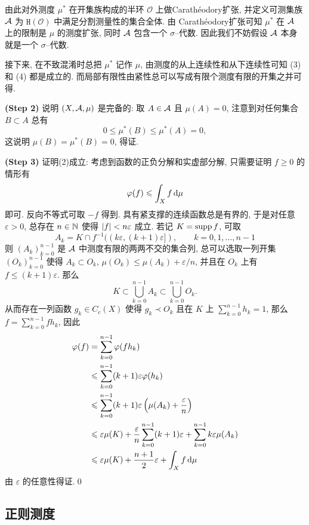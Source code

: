 \begin{Proof}
		由此对外测度 $ \mu^* $ 在开集族构成的半环 $ \mathcal{O} $ 上做Carath\'eodory扩张, 并定义可测集族 $ \mathcal{A} $ 为 $ \mathtt{H}(\mathcal{O}) $ 中满足分割测量性的集合全体. 由 Carath\'eodory扩张可知 $ \mu^* $ 在 $ \mathcal{A} $ 上的限制是 $ \mu $ 的测度扩张, 同时 $ \mathcal{A} $ 包含一个 $ \sigma $--代数. 因此我们不妨假设 $ \mathcal{A} $ 本身就是一个 $ \sigma $--代数.

		接下来, 在不致混淆时总把 $ \mu^* $ 记作 $ \mu $, 由测度的从上连续性和从下连续性可知 (3) 和 (4) 都是成立的. 而局部有限性由紧性总可以写成有限个测度有限的开集之并可得.

		\textbf{(Step 2)} 说明 $ (X,\mathcal{A},\mu) $ 是完备的: 取 $ A\in\mathcal{A} $ 且 $ \mu(A)=0 $, 注意到对任何集合 $ B\subset A $ 总有
		\[
			0\leqslant\mu^*(B)\leqslant\mu^*(A)=0,
		\]
		这说明 $ \mu(B)=\mu^*(B)=0 $, 得证.

		\textbf{(Step 3)} 证明(2)成立: 考虑到函数的正负分解和实虚部分解, 只需要证明 $ f\geqslant 0 $ 的情形有
		\[
			\varphi(f)\leqslant\int_Xf\,\mathrm{d}\mu
		\]
		即可. 反向不等式可取 $ -f $ 得到. 具有紧支撑的连续函数总是有界的, 于是对任意 $ \varepsilon>0 $, 总存在 $ n\in\mathbb{N} $ 使得 $ \left| f \right| <n\varepsilon $ 成立. 若记 $ K=\mathrm{supp}\, f $, 可取
		\[
			A_k=K\cap f^{-1}((k\varepsilon,(k+1)\varepsilon]),\qquad k=0,1,\dots,n-1
		\]
		则 $ (A_k)_{k=0}^{n-1} $ 是 $ \mathcal{A} $ 中测度有限的两两不交的集合列, 总可以选取一列开集 $ (O_k)_{k=0}^{n-1} $ 使得 $ A_k\subset O_k $, $ \mu(O_k)\leqslant\mu(A_k)+\varepsilon/n $, 并且在 $ O_k $ 上有 $ f\leqslant (k+1)\varepsilon $. 那么
		\[
			K\subset\bigcup_{k=0}^{n-1}A_k\subset\bigcup_{k=0}^{n-1}O_k.
		\]
		从而存在一列函数 $ g_k\in C_c(X) $ 使得 $ g_k\prec O_k $ 且在 $ K $ 上 $ \sum\limits_{k=0}^{n-1}h_k=1 $, 那么 $ f=\sum\limits_{k=0}^{n-1}fh_k $, 因此
		\[
			\begin{aligned}
				\varphi(f)&=\sum_{k=0}^{n-1}\varphi(fh_k)\\
				&\leqslant\sum_{k=0}^{n-1}(k+1)\varepsilon\varphi(h_k)\\
				&\leqslant\sum_{k=0}^{n-1}(k+1)\varepsilon\left(\mu(A_k)+\frac{\varepsilon}{n}\right)\\
				&\leqslant\varepsilon\mu(K)+\frac{\varepsilon}{n}\sum_{k=0}^{n-1}(k+1)\varepsilon+\sum_{k=0}^{n-1}k\varepsilon\mu(A_k)\\
				&\leqslant\varepsilon\mu(K)+\frac{n+1}{2}\varepsilon+\int_Xf\,\mathrm{d}\mu
			\end{aligned}
		\]
		由 $ \varepsilon $ 的任意性得证.\qed
	\end{Proof}

	\subsection{正则测度}

